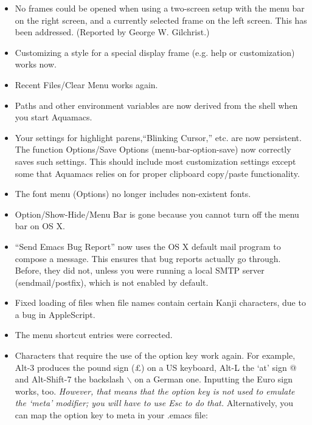 \begin{itemize}
\item No frames could be opened when using a two-screen setup
    with the menu bar on the right screen, and a currently selected
    frame on the left screen. This has been addressed.  (Reported by George W. Gilchrist.)

\item Customizing a style for a special display frame (e.g.  help or
    customization) works now.

\item Recent Files/Clear Menu works again.

\item Paths and other environment variables are now derived
    from the shell  when
    you start Aquamacs. 



\item Your settings for highlight parens,``Blinking Cursor,'' etc.  are now
    persistent. The function Options/Save Options
    (menu-bar-option-save) now correctly saves such settings. This
    should include most customization settings except some that
    Aquamacs relies on for proper clipboard copy/paste functionality.

\item The font menu (Options) no longer includes non-existent fonts. 

\item Option/Show-Hide/Menu Bar is gone because you cannot turn off  the
    menu bar on OS X.

\item ``Send Emacs Bug Report'' now uses the OS X
    default mail program to compose
    a message. This ensures that bug reports actually go through.
    Before, they did not, unless you were running a local SMTP server
    (sendmail/postfix), which is not enabled by default.

\item Fixed loading of files when file names contain certain  Kanji characters,
    due to a bug in AppleScript.

\item The menu shortcut entries were corrected.

\item Characters that require the use of the option key work again. For
    example, Alt-3 produces the pound sign (£) on a US keyboard,
    Alt-L the `at' sign @ and Alt-Shift-7 the backslash $\backslash$ on a
    German one. Inputting the Euro sign works, too. \textit{However, that means that the option key is not used to emulate
    the `meta' modifier;  you will have to use Esc to do that.}
    Alternatively, you can map the option key to meta in your .emacs
    file:


\end{itemize}
